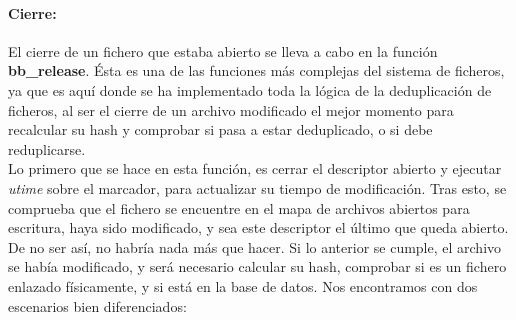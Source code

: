 \documentclass[12pt,a4paper]{article}
\begin{document}
\paragraph{Cierre:} El cierre de un fichero que estaba abierto se lleva a cabo en la función \textbf{bb\_release}. Ésta es una de las funciones más complejas del sistema de ficheros, ya que es aquí donde se ha implementado toda la lógica de la deduplicación de ficheros, al ser el cierre de un archivo modificado el mejor momento para recalcular su hash y comprobar si pasa a estar deduplicado, o si debe reduplicarse.\\
Lo primero que se hace en esta función, es cerrar el descriptor abierto y ejecutar \emph{utime} sobre el marcador, para actualizar su tiempo de modificación. Tras esto, se comprueba que el fichero se encuentre en el mapa de archivos abiertos para escritura, haya sido modificado, y sea este descriptor el último que queda abierto. De no ser así, no habría nada más que hacer. Si lo anterior se cumple, el archivo se había modificado, y será necesario calcular su hash, comprobar si es un fichero enlazado físicamente, y si está en la base de datos. Nos encontramos con dos escenarios bien diferenciados:
\end{document}
